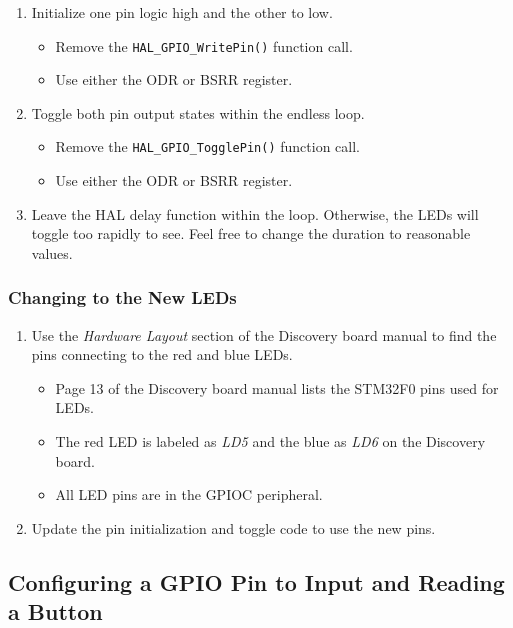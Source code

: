 \documentclass[11pt,fleqn]{book} %
\begin{document}
\begin{enumerate}
    \item Initialize one pin logic high and the other to low.
    \begin{itemize}
        \item Remove the \texttt{HAL\_GPIO\_WritePin()} function call.
        \item Use either the ODR or BSRR register.  
    \end{itemize}
    \item Toggle both pin output states within the endless loop.
    \begin{itemize}
        \item Remove the \texttt{HAL\_GPIO\_TogglePin()} function call.
        \item Use either the ODR or BSRR register. 
    \end{itemize}
    \item Leave the HAL delay function within the loop. Otherwise, the LEDs will toggle too rapidly to see. Feel free to change the duration to reasonable values.
\end{enumerate}


\subsubsection{Changing to the New LEDs}

\begin{enumerate}
    \item Use the \textit{Hardware Layout} section of the Discovery board manual to find the pins connecting to the red and blue LEDs.  
    \begin{itemize}
        \item Page 13 of the Discovery board manual lists the STM32F0 pins used for LEDs.
        \item The red LED is labeled as \textit{LD5} and the blue as \textit{LD6} on the Discovery board.
        \item All LED pins are in the GPIOC peripheral. 
    \end{itemize}
    \item Update the pin initialization and toggle code to use the new pins.
\end{enumerate}


\subsection{Configuring a GPIO Pin to Input and Reading a Button}
\end{document}
